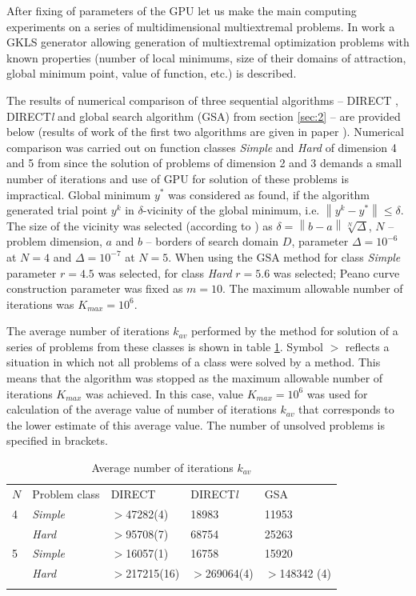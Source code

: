 \documentclass[smallcondensed]{svjour3}     %
\begin{document}
After fixing of parameters of the GPU let us make the main computing experiments on a series of multidimensional multiextremal problems. In work \cite{RefGaviano} a GKLS generator allowing generation of multiextremal optimization problems with known properties (number of local minimums, size of their domains of attraction, global minimum point, value of function, etc.) is described.  

The results of numerical comparison of three sequential algorithms -- DIRECT \cite{RefJones}, DIRECT\textit{l} \cite{RefGablonsky} and global search algorithm (GSA) from section \ref{sec:2} -- are provided below (results of work of the first two algorithms are given in paper \cite{RefGaviano}). Numerical comparison was carried out on function classes \textit{Simple} and \textit{Hard} of dimension 4 and 5 from \cite{RefGaviano} since the solution of problems of dimension 2 and 3 demands a small number of iterations and use of GPU for solution of these problems is impractical. Global minimum $y^\ast$ was considered as found, if the algorithm generated trial point $y^k$ in $\delta$-vicinity of the global minimum, i.e. $\left\|y^k-y^\ast\right\|\leq\delta$. The size of the vicinity was selected (according to \cite{RefGaviano}) as $\delta = \left\|b-a\right\|\sqrt[N]{\Delta}$, $N$ -- problem dimension, $a$ and $b$ -- borders of search domain $D$, parameter $\Delta=10^{-6}$ at $N=4$ and $\Delta=10^{-7}$ at $N=5$. When using the GSA method for class \textit{Simple} parameter $r=4.5$ was selected, for class \textit{Hard} $r=5.6$ was selected; Peano curve construction parameter was fixed as $m=10$. The maximum allowable number of iterations was $K_{max} = 10^6$.

The average number of iterations $k_{av}$ performed by the method for solution of a series of problems from these classes is shown in table \ref{tab:3}. Symbol $>$ reflects a situation in which not all problems of a class were solved by a method. This means that the algorithm was stopped as the maximum allowable number of iterations $K_{max}$ was achieved. In this case, value $K_{max}=10^6$ was used for calculation of the average value of number of iterations $k_{av}$ that corresponds to the lower estimate of this average value. The number of unsolved problems is specified in brackets.

\begin{table}
	\caption{Average number of iterations $k_{av}$}
	\label{tab:3}
	\center
	\begin{tabular}{lllll}
		\hline\noalign{\smallskip}
  	 $N$ & Problem class & DIRECT & DIRECT\textit{l} & GSA \\
		\noalign{\smallskip} \hline \noalign{\smallskip}
			4 &	\textit{Simple}	& $>$47282(4) &	18983 &	11953 \\
	      & \textit{Hard} &	$>$95708(7) &	68754 &	25263 \\
			5	& \textit{Simple} &	$>$16057(1) &	16758 &	15920 \\
				& \textit{Hard} &	$>$217215(16) &	$>$269064(4) & $>$148342 (4) \\
		\noalign{\smallskip}\hline
	\end{tabular}
\end{table}
\end{document}
